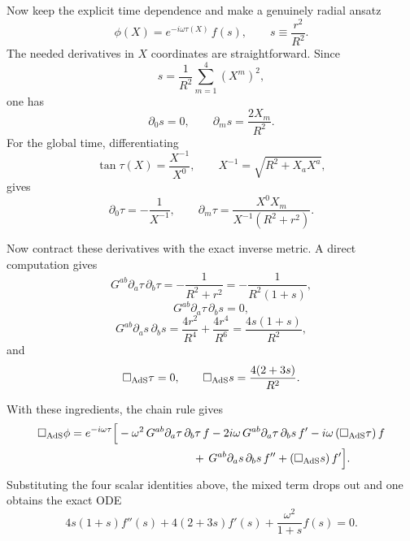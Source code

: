 \documentclass[12pt]{article}
\begin{document}
Now keep the explicit time dependence and make a genuinely radial ansatz
\begin{equation}
\phi(X)=e^{-i\omega\tau(X)}\,f(s),
\qquad
s\equiv \frac{r^2}{R^2}.
\end{equation}
The needed derivatives in $X$ coordinates are straightforward.  Since
\[
s=\frac{1}{R^2}\sum_{m=1}^4 (X^m)^2,
\]
one has
\begin{equation}
\partial_0 s=0,
\qquad
\partial_m s=\frac{2X_m}{R^2}.
\end{equation}
For the global time, differentiating
\[
\tan\tau(X)=\frac{X^{-1}}{X^0},
\qquad
X^{-1}=\sqrt{R^2+X_aX^a},
\]
gives
\begin{equation}
\partial_0\tau=-\frac{1}{X^{-1}},
\qquad
\partial_m\tau=\frac{X^0X_m}{X^{-1}(R^2+r^2)}.
\end{equation}

Now contract these derivatives with the exact inverse metric.  A direct computation gives
\begin{equation}
G^{ab}\partial_a\tau\,\partial_b\tau
=
-\frac{1}{R^2+r^2}
=
-\frac{1}{R^2(1+s)},
\end{equation}
\begin{equation}
G^{ab}\partial_a\tau\,\partial_b s=0,
\end{equation}
\begin{equation}
G^{ab}\partial_a s\,\partial_b s
=
\frac{4r^2}{R^4}+\frac{4r^4}{R^6}
=
\frac{4s(1+s)}{R^2},
\end{equation}
and
\begin{equation}
\Box_{\rm AdS}\tau=0,
\qquad
\Box_{\rm AdS}s=\frac{4(2+3s)}{R^2}.
\end{equation}

With these ingredients, the chain rule gives
\begin{align}
\Box_{\rm AdS}\phi
&=
e^{-i\omega\tau}\Big[
-\omega^2\,G^{ab}\partial_a\tau\,\partial_b\tau\, f
-2i\omega\,G^{ab}\partial_a\tau\,\partial_b s\, f'
-i\omega\,(\Box_{\rm AdS}\tau)\,f
\notag\\
&\hspace{3.8cm}
+\,G^{ab}\partial_a s\,\partial_b s\, f''
+(\Box_{\rm AdS}s)\,f'
\Big].
\end{align}
Substituting the four scalar identities above, the mixed term drops out and one obtains the exact ODE
\begin{equation}
4s(1+s)f''(s)+4(2+3s)f'(s)+\frac{\omega^2}{1+s}f(s)=0.
\end{equation}
\end{document}
